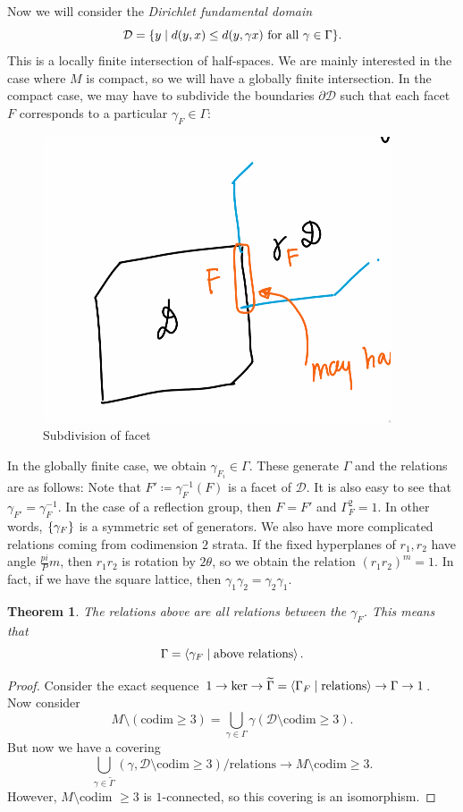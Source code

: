 \documentclass[leqno, openany]{memoir}
\newtheorem{thm}{Theorem}[section]
\theoremstyle{definition}
\theoremstyle{remark}
\theoremstyle{plain}
\theoremstyle{definition}
\theoremstyle{remark}
\newcommand{\mc}[1]{\mathcal{#1}}
\newcommand{\wtl}[1]{\widetilde{#1}}
\begin{document}
Now we will consider the \textit{Dirichlet fundamental domain}
\[ \mc{D} = \qty{y \mid d(y,x) \leq d(y, \gamma x) \text{ for all } \gamma \in \Gamma}. \]
This is a locally finite intersection of half-spaces. We are mainly interested in the case where $M$ is compact, so we will have a globally finite intersection. In the compact case, we may have to subdivide the boundaries $\partial \mc{D}$ such that each facet $F$ corresponds to a particular $\gamma_F \in \Gamma$:
\begin{figure}[H]
    \centering
    \includegraphics[scale=0.5]{fd_domain.png}
    \caption{Subdivision of facet}%
    \label{fig:fd_domain}
\end{figure}
In the globally finite case, we obtain $\gamma_{F_i} \in \Gamma$. These generate $\Gamma$ and the relations are as follows: Note that $F' \coloneqq \gamma_F^{-1}(F)$ is a facet of $\mc{D}$. It is also easy to see that $\gamma_{F'} = \gamma_F^{-1}$. In the case of a reflection group, then $F = F'$ and $\Gamma_F^2 = 1$. In other words, $\qty{\gamma_F}$ is a symmetric set of generators. We also have more complicated relations coming from codimension $2$ strata. If the fixed hyperplanes of $r_1, r_2$ have angle $\frac{pi}Pm$, then $r_1 r_2$ is rotation by $2 \theta$, so we obtain the relation ${(r_1 r_2)}^m = 1$. In fact, if we have the square lattice, then $\gamma_1 \gamma_2 = \gamma_2 \gamma_1$.

\begin{thm}
    The relations above are all relations between the $\gamma_F$. This means that 
    \[ \Gamma = \ev{\gamma_F \mid \text{above relations}}. \]
\end{thm}

\begin{proof}
    Consider the exact sequence $1 \to \ker \to \wtl{\Gamma} = \ev{\Gamma_F \mid \text{relations}} \to \Gamma \to 1$. Now consider 
    \[ M \setminus ( \text{codim}\geq 3 ) = \bigcup_{\gamma \in \Gamma} \gamma(\mc{D} \setminus \text{codim} \geq 3). \]
    But now we have a covering
    \[ \bigcup_{\gamma \in \wtl{\Gamma}} (\gamma, \mc{D} \setminus \text{codim}\geq 3) / \text{relations} \to M \setminus \text{codim}\geq 3. \]
    However, $M \setminus \text{codim }\geq 3$ is $1$-connected, so this covering is an isomorphism.
\end{proof}
\end{document}
